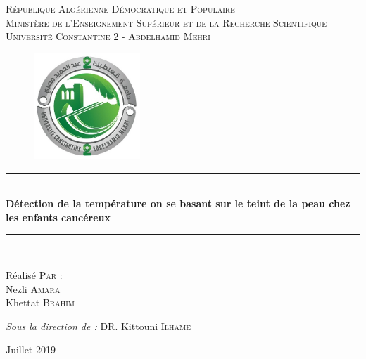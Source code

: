 \documentclass[12pt]{article}
\newcommand{\HRule}{\rule{\linewidth}{0.5mm}}
\begin{document}
\begin{titlepage}
	\begin{sffamily}
		\begin{center}
		\textsc{République Algérienne Démocratique et Populaire\\Ministère de l'Enseignement Supérieur et de la Recherche Scientifique\\Université Constantine 2 - Abdelhamid Mehri}\\[0.5 cm]			\begin{figure}[h]
			\centering
			\includegraphics[height=4cm,width=4cm]{Logo/logo.jpg}
		\end{figure}
		
		 \HRule \\[0.2cm]
    { \huge \bfseries Détection de la température on se basant sur le teint de la peau chez les enfants cancéreux\\[0.2cm] }
    \HRule \\[4cm]
    
    
        \begin{minipage}{0.4\textwidth}
      \begin{flushleft} \large
      	Réalisé \textsc{Par :}\\
		Nezli \textsc{Amara}\\
        Khettat \textsc{Brahim}\\
      \end{flushleft}
    \end{minipage}
    \begin{minipage}{0.4\textwidth}
      \begin{flushright} \large
        \emph{Sous la direction de : } DR. Kittouni \textsc{Ilhame}
      \end{flushright}
    \end{minipage}

    \vfill

    {\large Juillet 2019}
		\end{center}
	\end{sffamily}
\end{titlepage}
\end{document}
